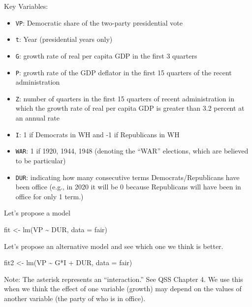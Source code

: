 \documentclass[
  letterpaper,
  DIV=11,
  numbers=noendperiod]{scrreprt}
\newenvironment{Shaded}{\begin{snugshade}}{\end{snugshade}}
\newcommand{\AttributeTok}[1]{\textcolor[rgb]{0.40,0.45,0.13}{#1}}
\newcommand{\FunctionTok}[1]{\textcolor[rgb]{0.28,0.35,0.67}{#1}}
\newcommand{\NormalTok}[1]{\textcolor[rgb]{0.00,0.23,0.31}{#1}}
\newcommand{\OtherTok}[1]{\textcolor[rgb]{0.00,0.23,0.31}{#1}}
\newcommand{\SpecialCharTok}[1]{\textcolor[rgb]{0.37,0.37,0.37}{#1}}
\providecommand{\tightlist}{%
  \setlength{\itemsep}{0pt}\setlength{\parskip}{0pt}}\usepackage{longtable,booktabs,array}
\begin{document}
Key Variables:

\begin{itemize}
\tightlist
\item
  \texttt{VP}: Democratic share of the two-party presidential vote
\item
  \texttt{t}: Year (presidential years only)
\item
  \texttt{G}: growth rate of real per capita GDP in the first 3 quarters
\item
  \texttt{P}: growth rate of the GDP deflator in the first 15 quarters
  of the recent administration
\item
  \texttt{Z}: number of quarters in the first 15 quarters of recent
  administration in which the growth rate of real per capita GDP is
  greater than 3.2 percent at an annual rate
\item
  \texttt{I}: 1 if Democrats in WH and -1 if Republicans in WH
\item
  \texttt{WAR}: 1 if 1920, 1944, 1948 (denoting the ``WAR'' elections,
  which are believed to be particular)
\item
  \texttt{DUR}: indicating how many consecutive terms
  Democrats/Republicans have been office (e.g., in 2020 it will be 0
  because Republicans will have been in office for only 1 term.)
\end{itemize}

Let's propose a model

\begin{Shaded}
\begin{Highlighting}[]
\NormalTok{fit }\OtherTok{\textless{}{-}} \FunctionTok{lm}\NormalTok{(VP }\SpecialCharTok{\textasciitilde{}}\NormalTok{ DUR, }\AttributeTok{data =}\NormalTok{ fair)}
\end{Highlighting}
\end{Shaded}

Let's propose an alternative model and see which one we think is better.

\begin{Shaded}
\begin{Highlighting}[]
\NormalTok{fit2 }\OtherTok{\textless{}{-}} \FunctionTok{lm}\NormalTok{(VP }\SpecialCharTok{\textasciitilde{}}\NormalTok{ G}\SpecialCharTok{*}\NormalTok{I }\SpecialCharTok{+}\NormalTok{  DUR, }\AttributeTok{data =}\NormalTok{ fair)}
\end{Highlighting}
\end{Shaded}

Note: The asterisk represents an ``interaction.'' See QSS Chapter 4. We
use this when we think the effect of one variable (growth) may depend on
the values of another variable (the party of who is in office).
\end{document}
